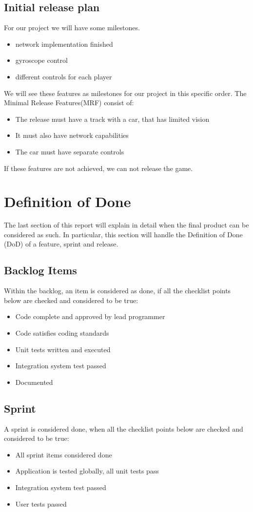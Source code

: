 \documentclass[11pt,twoside,a4paper]{article}
\begin{document}
\subsection{Initial release plan}
For our project we will have some milestones.
\begin{itemize}
\item network implementation finished
\item gyroscope control
\item different controls for each player
\end{itemize}
We will see these features as milestones for our project in this specific order. The Minimal Release Features(MRF) consist of:
\begin{itemize}
\item The release must have a track with a car, that has limited vision
\item It must also have network capabilities
\item The car must have separate controls
\end{itemize}
If these features are not achieved, we can not release the game.

\newpage

\section{Definition of Done}
The last section of this report will explain in detail when the final product can be considered as such. In particular, this section will  handle the Definition of Done (DoD) of a feature, sprint and release.
\subsection{Backlog Items}
Within the backlog, an item is considered as done, if all the checklist points below are checked and considered to be true:
\begin{itemize}
	\item Code complete and approved by lead programmer
	\item Code satisfies coding standards
	\item Unit tests written and executed
	\item Integration system test passed
	\item Documented
\end{itemize}
\subsection{Sprint}
A sprint is considered done, when all the checklist points below are checked and considered to be true:
\begin{itemize}
	\item All sprint items considered done
	\item Application is tested globally, all unit tests pass
	\item Integration system test passed
	\item User tests passed
\end{itemize}
\end{document}

